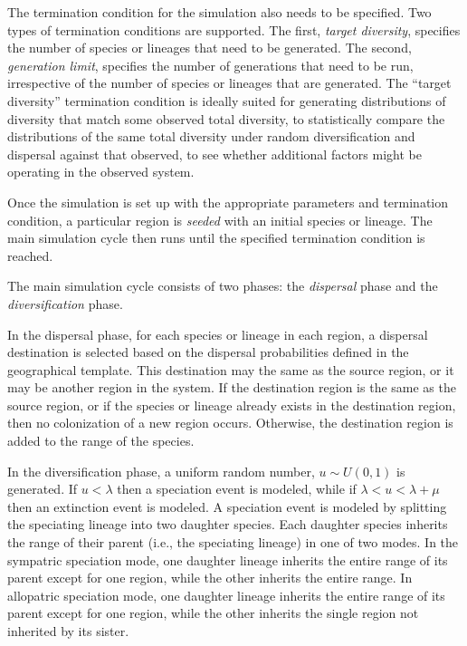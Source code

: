 \documentclass[11pt]{article}
\begin{document}
The termination condition for the simulation also needs to be specified.
Two types of termination conditions are supported.
The first, \textit{target diversity}, specifies the number of species or lineages that need to be generated.
The second, \textit{generation limit}, specifies the number of generations that need to be run, irrespective of the number of species or lineages that are generated.
The ``target diversity'' termination condition is ideally suited for generating distributions of diversity that match some observed total diversity, to statistically compare the distributions of the same total diversity under random diversification and dispersal against that observed, to see whether additional factors might be operating in the observed system.

Once the simulation is set up with the appropriate parameters and termination condition, a particular region is \textit{seeded} with an initial species or lineage. 
The main simulation cycle then runs until the specified termination condition is reached.

The main simulation cycle consists of two phases: the \textit{dispersal} phase and the \textit{diversification} phase.

In the dispersal phase, for each species or lineage in each region, a dispersal destination is selected based on the dispersal probabilities defined in the geographical template.
This destination may the same as the source region, or it may be another region in the system.
If the destination region is the same as the source region, or if the species or lineage already exists in the destination region, then no colonization of a new region occurs.
Otherwise, the destination region is added to the range of the species.

In the diversification phase, a uniform random number, $u \sim U(0,1)$ is generated.
If $u < \lambda$ then a speciation event is modeled, while if $\lambda < u < \lambda + \mu$ then an extinction event is modeled.
A speciation event is modeled by splitting the speciating lineage into two daughter species.
Each daughter species inherits the range of their parent (i.e., the speciating lineage) in one of two modes.
In the sympatric speciation mode, one daughter lineage inherits the entire range of its parent except for one region, while the other inherits the entire range.
In allopatric speciation mode, one daughter lineage inherits the entire range of its parent except for one region, while the other inherits the single region not inherited by its sister.
\end{document}
